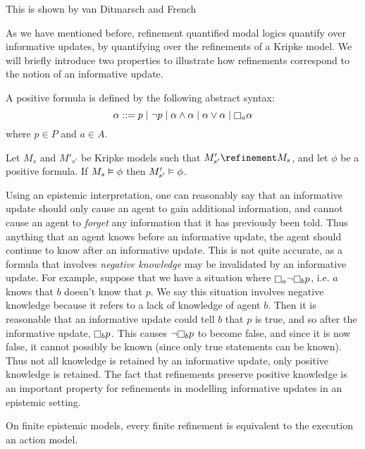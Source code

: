This is shown by van Ditmarsch and French~\cite{french2009simulation}

As we have mentioned before, refinement quantified modal logics quantify over
informative updates, by quantifying over the refinements of a Kripke model. We
will briefly introduce two properties to illustrate how refinements correspond
to the notion of an informative update.

\begin{definition}
A positive formula is defined by the following abstract syntax:
$$
\alpha ::=    p \bnfalt 
            \neg p \bnfalt
            \alpha \land \alpha \bnfalt
            \alpha \lor \alpha \bnfalt
            \knows_a \alpha
$$
where $p \in P$ and $a \in A$.
\end{definition}

\begin{proposition}\label{pre-positive}
Let $M_s$ and $M'_{s'}$ be Kripke models such that $M'_{s'} \refinement M_s$,
and let $\phi$ be a positive formula. If $M_s \vDash \phi$ then $M'_{s'}
\vDash \phi$. 
\end{proposition}

Using an epistemic interpretation, one can reasonably say that an informative
update should only cause an agent to gain additional information, and cannot
cause an agent to {\em forget} any information that it has previously been told.
Thus anything that an agent knows before an informative update, the agent should
continue to know after an informative update. This is not quite accurate, as a
formula that involves {\em negative knowledge} may be invalidated by an
informative update. For example, suppose that we have a situation where
$\knows_a \neg \knows_b p$, i.e. $a$ knows that $b$ doesn't know that $p$. We
say this situation involves negative knowledge because it refers to a lack of
knowledge of agent $b$. Then it is reasonable that an informative update could
tell $b$ that $p$ is true, and so after the informative update, $\knows_b p$.
This causes $\neg \knows_b p$ to become false, and since it is now false, it
cannot possibly be known (since only true statements can be known). Thus not all
knowledge is retained by an informative update, only positive knowledge is
retained. The fact that refinements preserve positive knowledge is an important
property for refinements in modelling informative updates in an epistemic
setting.


\begin{proposition}
On finite epistemic models, every finite refinement is equivalent to the
execution an action model.
\end{proposition}

